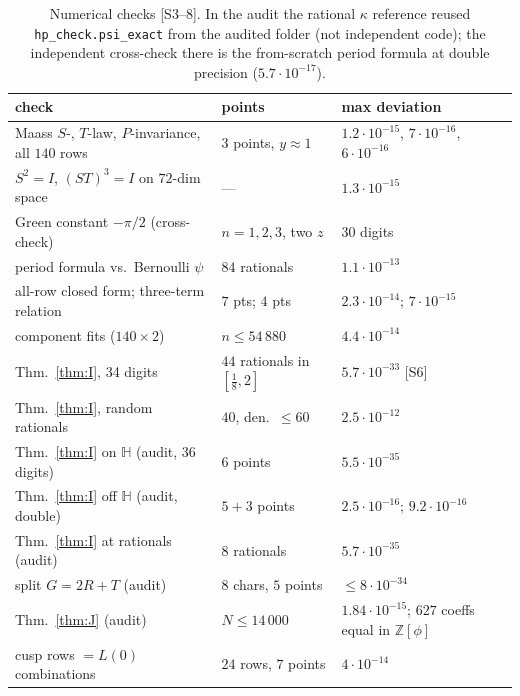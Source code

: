 \documentclass[11pt]{article}
\theoremstyle{definition}
\theoremstyle{plain}
\newcommand{\Z}{\mathbb{Z}}
\newcommand{\Hb}{\mathbb{H}}
\newcommand{\src}[1]{\textup{[S#1]}}
\begin{document}
\begin{table}[ht]\centering\small
\begin{tabular}{p{6.4cm}p{4.0cm}p{4.0cm}}\toprule
check & points & max deviation\\\midrule
Maass $S$-, $T$-law, $P$-invariance, all $140$ rows & 3 points, $y\approx1$ & $1.2\cdot10^{-15}$, $7\cdot10^{-16}$, $6\cdot10^{-16}$\\
$S^2=I$, $(ST)^3=I$ on $72$-dim space & --- & $1.3\cdot10^{-15}$\\
Green constant $-\pi/2$ (cross-check) & $n=1,2,3$, two $z$ & 30 digits\\
period formula vs.\ Bernoulli $\psi$ & $84$ rationals & $1.1\cdot10^{-13}$\\
all-row closed form; three-term relation & $7$ pts; $4$ pts & $2.3\cdot10^{-14}$; $7\cdot10^{-15}$\\
component fits ($140\times2$) & $n\le54\,880$ & $4.4\cdot10^{-14}$\\
Thm.~\ref{thm:I}, 34 digits & $44$ rationals in $[\tfrac18,2]$ & $5.7\cdot10^{-33}$ \src{6}\\
Thm.~\ref{thm:I}, random rationals & $40$, den.\ $\le60$ & $2.5\cdot10^{-12}$\\
Thm.~\ref{thm:I} on $\Hb$ (audit, 36 digits) & $6$ points & $5.5\cdot10^{-35}$\\
Thm.~\ref{thm:I} off $\Hb$ (audit, double) & $5+3$ points & $2.5\cdot10^{-16}$; $9.2\cdot10^{-16}$\\
Thm.~\ref{thm:I} at rationals (audit) & $8$ rationals & $5.7\cdot10^{-35}$\\
split $G=2R+T$ (audit) & $8$ chars, $5$ points & $\le8\cdot10^{-34}$\\
Thm.~\ref{thm:J} (audit) & $N\le14\,000$ & $1.84\cdot10^{-15}$; $627$ coeffs equal in $\Z[\phi]$\\
cusp rows $=L(0)$ combinations & $24$ rows, $7$ points & $4\cdot10^{-14}$\\\bottomrule
\end{tabular}
\caption{Numerical checks \src{3--8}. In the audit the rational $\kappa$ reference reused \texttt{hp\_check.psi\_exact} from the audited folder
(not independent code); the independent cross-check there is the from-scratch period formula at double precision ($5.7\cdot10^{-17}$).}
\end{table}
\end{document}
